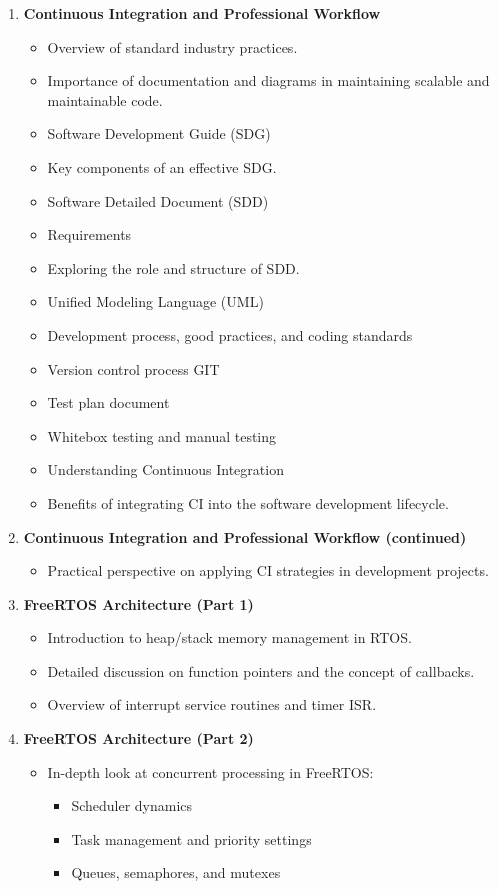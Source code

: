 \begin{enumerate}[label=\textbf{Week \arabic*:}]
    \item \textbf{Continuous Integration and Professional Workflow}     
    \begin{itemize}
        \item Overview of standard industry practices.
        \item Importance of documentation and diagrams in maintaining scalable and maintainable code.
        \item Software Development Guide (SDG)
        \item Key components of an effective SDG.
        \item Software Detailed Document (SDD)
        \item Requirements
        \item Exploring the role and structure of SDD.
        \item Unified Modeling Language (UML)
        \item Development process, good practices, and coding standards
        \item Version control process GIT
        \item Test plan document
        \item Whitebox testing and manual testing
        \item Understanding Continuous Integration
        \item Benefits of integrating CI into the software development lifecycle.
    \end{itemize}

    \item \textbf{Continuous Integration and Professional Workflow (continued)}
    \begin{itemize}
        \item Practical perspective on applying CI strategies in development projects.
    \end{itemize}

    \item \textbf{FreeRTOS Architecture (Part 1)}
    \begin{itemize}
        \item Introduction to heap/stack memory management in RTOS.
        \item Detailed discussion on function pointers and the concept of callbacks.
        \item Overview of interrupt service routines and timer ISR.
    \end{itemize}

    \item \textbf{FreeRTOS Architecture (Part 2)}
    \begin{itemize}
        \item In-depth look at concurrent processing in FreeRTOS:
        \begin{itemize}
            \item Scheduler dynamics
            \item Task management and priority settings
            \item Queues, semaphores, and mutexes
        \end{itemize}
    \end{itemize}


\end{enumerate}
